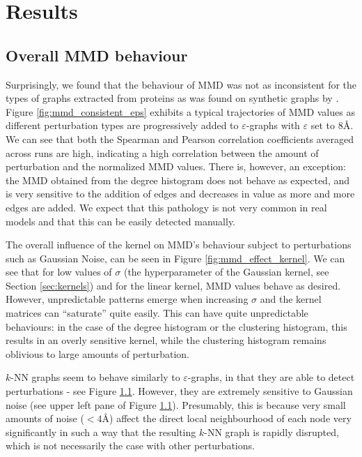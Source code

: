 \chapter{Results}

\section{Overall MMD behaviour}

Surprisingly, we found that the behaviour of MMD was not as inconsistent for the
types of graphs extracted from proteins as was found on synthetic graphs by
\cite{o2021evaluation}. Figure \ref{fig:mmd_consistent_eps} exhibits a typical
trajectories of MMD values as different perturbation types are progressively
added to $\varepsilon$-graphs with $\varepsilon$ set to $8$\si{\angstrom}. We
can see that both the Spearman and Pearson correlation coefficients averaged
across runs are high, indicating a high correlation between the amount of
perturbation and the normalized MMD values. There is, however, an exception: the
MMD obtained from the degree histogram does not behave as expected, and is very
sensitive to the addition of edges and decreases in value as more and more edges
are added. We expect that this pathology is not very common in real models and
that this can be easily detected manually.

The overall influence of the kernel on MMD's behaviour subject to
perturbations such as Gaussian Noise, can be seen in Figure \ref{fig:mmd_effect_kernel}. We can
see that for low values of $\sigma$ (the hyperparameter of the Gaussian kernel,
see Section \ref{sec:kernels}) and for the linear kernel, MMD values behave as
desired. However, unpredictable patterns emerge when increasing $\sigma$ and the
kernel matrices can ``saturate'' quite easily. This can have quite unpredictable
behaviours: in the case of the degree histogram or the clustering histogram,
this results in an overly sensitive kernel, while the clustering histogram
remains oblivious to large amounts of perturbation.

$k$-NN graphs seem to behave similarly to $\varepsilon$-graphs, in that they are
able to detect perturbations - see Figure \ref{}. However, they are extremely
sensitive to Gaussian noise (see upper left pane of Figure \ref{}). Presumably, this is
because very small amounts of noise ($<4$\si{\angstrom}) affect the direct local
neighbourhood of each node very significantly in such a way that the resulting
$k$-NN graph is rapidly disrupted, which is not necessarily the case with other
perturbations.


